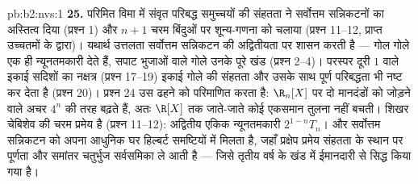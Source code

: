 \begin{solution}{pb:b2:nvs:1}
\textbf{25.} परिमित विमा में संवृत परिबद्ध समुच्चयों की संहतता ने
सर्वोत्तम सन्निकटनों का अस्तित्व दिया (प्रश्न 1) और $n + 1$ चरम बिंदुओं पर
शून्य-गणना को चलाया (प्रश्न 11--12, प्राप्त उच्चतमों के द्वारा)।
यथार्थ उत्तलता सर्वोत्तम सन्निकटन की अद्वितीयता पर शासन करती है ---
गोल गोले एक ही न्यूनतमकारी देते हैं, सपाट भुजाओं वाले गोले उनके पूरे
खंड (प्रश्न 2--4)। परस्पर दूरी $1$ वाले इकाई सदिशों का नक्षत्र (प्रश्न
17--19) इकाई गोले की संहतता और उसके साथ पूर्ण परिबद्धता भी नष्ट कर देता
है (प्रश्न 20)। प्रश्न 24 उस ढहने को परिमाणित करता है: $\R_n[X]$ पर दो
मानदंडों को जोड़ने वाले अचर $4^n$ की तरह बढ़ते हैं, अतः $\R[X]$ तक जाते-जाते
कोई एकसमान तुलना नहीं बचती। शिखर चेबिशेव की चरम प्रमेय है (प्रश्न
11--12): अद्वितीय एकिक न्यूनतमकारी $2^{1-n}T_n$। और सर्वोत्तम सन्निकटन को अपना
आधुनिक घर हिल्बर्ट समष्टियों में मिलता है, जहाँ प्रक्षेप प्रमेय संहतता
के स्थान पर पूर्णता और समांतर चतुर्भुज सर्वसमिका ले आती है --- जिसे
तृतीय वर्ष के खंड में ईमानदारी से सिद्ध किया गया है।
\end{solution}
